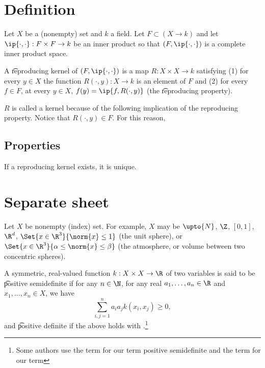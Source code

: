

  \section*{Definition}

Let $X$ be a (nonempty) set and $k$ a field.
Let $F \subset (X \to k)$ and let $\ip{\cdot , \cdot }: F \times F \to k$ be an inner product so that $(F, \ip{\cdot ,\cdot })$ is a complete inner product space.

A \t{reproducing kernel} of $(F, \ip{\cdot ,\cdot })$ is a map $R: X \times X \to k$ satisfying (1) for every $y \in X$ the function $R(\cdot , y): X \to k$ is an element of $F$ and (2) for every $f \in F$, at every $y \in X$, $f(y) = \ip{f, R(\cdot , y)}$ (the \t{reproducing property}).

$R$ is called a  kernel because of the following implication of the reproducing property.
Notice that $R(\cdot , y) \in F$.
For this reason,

\subsection*{Properties}

If a reproducing kernel exists, it is unique.

\section*{Separate sheet}

Let $X$ be nonempty (index) set.
For example, $X$ may be $\upto{N}$, $\Z $, $[0, 1]$, $\R ^d$, $\Set{x \in \R ^3}{\norm{x} \leq 1}$ (the unit sphere), or $\Set{x \in \R ^3}{\alpha  \leq \norm{x} \leq \beta }$ (the atmosphere, or volume between two concentric spheres).

A symmetric, real-valued function $k: X \times X \to \R $ of two variables is said to be \t{positive semidefinite} if for any $n \in \N  $, for any real $a_1, \dots , a_n \in \R $ and $x_1, \dots , x_n \in X$, we have
    \[
\sum_{i, j = 1}^{n} a_ia_j k(x_i, x_j) \geq 0,
    \]
and \t{positive definite} if the above holds with \say{$>$}.\footnote{Some authors use the term  for our term positive semidefinite and the term  for our term }

